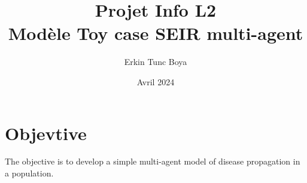 \documentclass{article}
\title{Projet Info \- L2 \\ Modèle Toy case SEIR multi-agent}
\author{Erkin Tunc Boya}
\date{Avril 2024}
\begin{document}
\maketitle
	
\section{Objevtive}
The objective is to develop a simple multi-agent model of disease propagation in a population.
	
	
\end{document}
